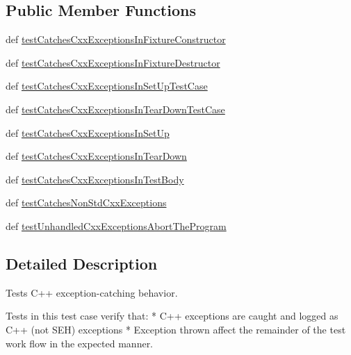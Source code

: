 \subsection*{Public Member Functions}
\begin{DoxyCompactItemize}
\item 
def \hyperlink{classgtest__catch__exceptions__test_1_1_catch_cxx_exceptions_test_af30847674228b57272a45b962e7f716a}{test\-Catches\-Cxx\-Exceptions\-In\-Fixture\-Constructor}
\item 
def \hyperlink{classgtest__catch__exceptions__test_1_1_catch_cxx_exceptions_test_acc8b0719b19b941dbed8635ee8f759b9}{test\-Catches\-Cxx\-Exceptions\-In\-Fixture\-Destructor}
\item 
def \hyperlink{classgtest__catch__exceptions__test_1_1_catch_cxx_exceptions_test_a42f2fc6eb388c8c866f58f47c4adc2b4}{test\-Catches\-Cxx\-Exceptions\-In\-Set\-Up\-Test\-Case}
\item 
def \hyperlink{classgtest__catch__exceptions__test_1_1_catch_cxx_exceptions_test_aa064d9457dce43eb3b310ff4a5c1849e}{test\-Catches\-Cxx\-Exceptions\-In\-Tear\-Down\-Test\-Case}
\item 
def \hyperlink{classgtest__catch__exceptions__test_1_1_catch_cxx_exceptions_test_a35b3fef2c4dd90a20d5a2d2c68a1ed5b}{test\-Catches\-Cxx\-Exceptions\-In\-Set\-Up}
\item 
def \hyperlink{classgtest__catch__exceptions__test_1_1_catch_cxx_exceptions_test_ae8c84c363edd9876a7276b3c03164da2}{test\-Catches\-Cxx\-Exceptions\-In\-Tear\-Down}
\item 
def \hyperlink{classgtest__catch__exceptions__test_1_1_catch_cxx_exceptions_test_aff010dde975259d18115d88338df210e}{test\-Catches\-Cxx\-Exceptions\-In\-Test\-Body}
\item 
def \hyperlink{classgtest__catch__exceptions__test_1_1_catch_cxx_exceptions_test_a6620ac176592ee1fe45a6cbb9cd71bd5}{test\-Catches\-Non\-Std\-Cxx\-Exceptions}
\item 
def \hyperlink{classgtest__catch__exceptions__test_1_1_catch_cxx_exceptions_test_a2c38615cebec6ba19cda4d8672b5f4ad}{test\-Unhandled\-Cxx\-Exceptions\-Abort\-The\-Program}
\end{DoxyCompactItemize}


\subsection{Detailed Description}
\begin{DoxyVerb}Tests C++ exception-catching behavior.

   Tests in this test case verify that:
   * C++ exceptions are caught and logged as C++ (not SEH) exceptions
   * Exception thrown affect the remainder of the test work flow in the
     expected manner.
\end{DoxyVerb}
 

